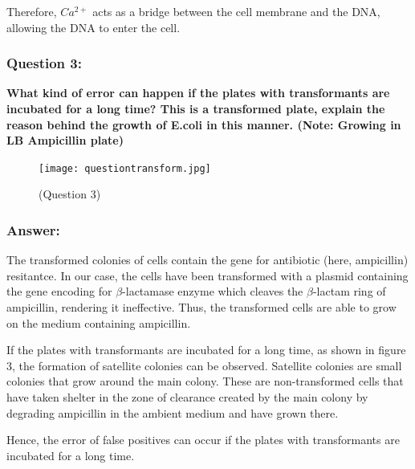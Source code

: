 \documentclass{report}
\begin{document}
Therefore, $Ca^{2+}$ acts as a bridge between the cell membrane and the DNA, allowing the DNA to enter the cell.




\subsubsection*{Question 3:}
\textbf{What kind of error can happen if the plates with transformants are incubated for 
a long time? This is a transformed plate, explain the reason behind the growth of E.coli in this manner. 
(Note: Growing in LB Ampicillin plate)}

\begin{figure}[!ht]
  \centering 
  \texttt{[image: questiontransform.jpg]} 
  \caption{(Question 3)} 
  \label{fig: growth of E.coli }  
\end{figure}


\subsubsection*{Answer:}

The transformed colonies of cells contain the gene for antibiotic (here, ampicillin) resitantce. In our case, the cells have been transformed with a plasmid containing the gene
encoding for $\beta$-lactamase enzyme which cleaves the $\beta$-lactam ring of ampicillin, rendering it ineffective. Thus, the transformed cells are able to grow on the medium containing ampicillin.

If the plates with transformants are incubated for a long time, as shown in figure 3, the formation of satellite colonies can be observed.
Satellite colonies are small colonies that grow around the main colony.
These are non-transformed cells that have taken shelter in the zone of clearance created by the main colony by degrading ampicillin in the ambient medium
and have grown there.

Hence, the error of false positives can occur if the plates with transformants are incubated for a long time.
\end{document}
